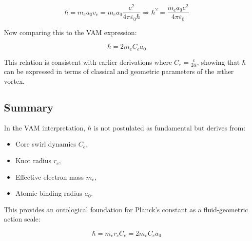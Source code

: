\begin{equation}
    \hbar = m_e a_0 v_e = m_e a_0 \frac{e^2}{4\pi \varepsilon_0 \hbar} \Rightarrow \hbar^2 = \frac{m_e a_0 e^2}{4\pi \varepsilon_0}
\end{equation}

Now comparing this to the VAM expression:

\begin{equation}
    \boxed{\hbar = 2 m_e C_e a_0}
\end{equation}

This relation is consistent with earlier derivations where \( C_e = \frac{c}{2\alpha} \), showing that \( \hbar \) can be expressed in terms of classical and geometric parameters of the æther vortex.

\subsection*{Summary}

In the VAM interpretation, \( \hbar \) is not postulated as fundamental but derives from:

\begin{itemize}
    \item Core swirl dynamics \( C_e \),
    \item Knot radius \( r_c \),
    \item Effective electron mass \( m_e \),
    \item Atomic binding radius \( a_0 \).
\end{itemize}

This provides an ontological foundation for Planck’s constant as a fluid-geometric action scale:

\begin{equation}
    \boxed{\hbar = m_e r_c C_e = 2 m_e C_e a_0}
\end{equation}
